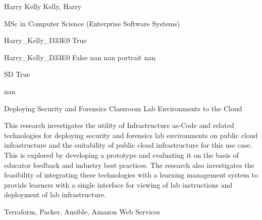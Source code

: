 
\begingroup{}\relax



\def\Key{Harry_Kelly_D33E0}

{Harry Kelly}
{Kelly, Harry}

{MSc in Computer Science (Enterprise Software Systems)}

{Harry_Kelly_D33E0}
{True}

{Harry_Kelly_D33E0}
{False}
{nan}
{nan}
{portrait}
{nan}

{SD}
{True}

{nan}

{Deploying Security and Forensics Classroom Lab Environments to the Cloud}

{This research investigates the utility of Infrastructure as-Code and related technologies for deploying security and forensics lab environments on public cloud infrastructure and the suitability of public cloud infrastructure for this use case. This is explored by developing a prototype and evaluating it on the basis of educator feedback and industry best practices. The research also investigates the feasibility of integrating these technologies with a learning management system to provide learners with a single interface for viewing of lab instructions and deployment of lab infrastructure.}

{Terraform, Packer, Ansible, Amazon Web Services}

